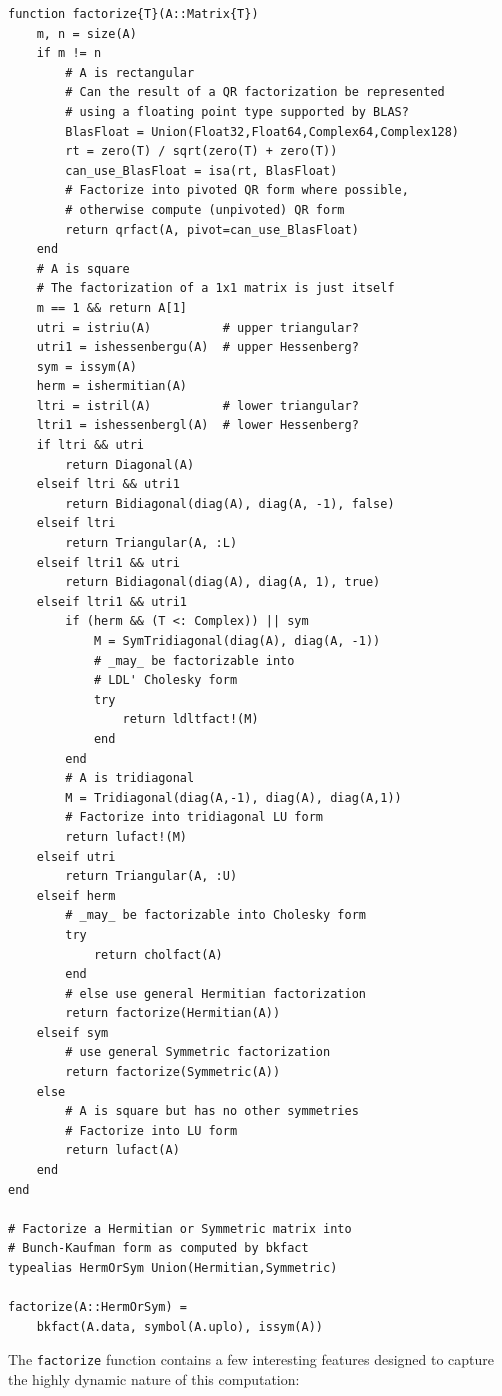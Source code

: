 \documentclass[10pt, preprint]{sigplanconf}
\begin{document}
\begin{lstlisting}
function factorize{T}(A::Matrix{T})
	m, n = size(A)
	if m != n
		# A is rectangular
		# Can the result of a QR factorization be represented
		# using a floating point type supported by BLAS?
		BlasFloat = Union(Float32,Float64,Complex64,Complex128)
		rt = zero(T) / sqrt(zero(T) + zero(T))
		can_use_BlasFloat = isa(rt, BlasFloat)
		# Factorize into pivoted QR form where possible,
		# otherwise compute (unpivoted) QR form
		return qrfact(A, pivot=can_use_BlasFloat)
	end
	# A is square
	# The factorization of a 1x1 matrix is just itself
	m == 1 && return A[1]
	utri = istriu(A)          # upper triangular?
	utri1 = ishessenbergu(A)  # upper Hessenberg?
	sym = issym(A)
	herm = ishermitian(A)
	ltri = istril(A)          # lower triangular?
	ltri1 = ishessenbergl(A)  # lower Hessenberg?
	if ltri && utri
		return Diagonal(A)
	elseif ltri && utri1
		return Bidiagonal(diag(A), diag(A, -1), false)
	elseif ltri
		return Triangular(A, :L)
	elseif ltri1 && utri
		return Bidiagonal(diag(A), diag(A, 1), true)
	elseif ltri1 && utri1
		if (herm && (T <: Complex)) || sym
			M = SymTridiagonal(diag(A), diag(A, -1))
			# _may_ be factorizable into
			# LDL' Cholesky form
			try
				return ldltfact!(M)
			end
		end
		# A is tridiagonal
		M = Tridiagonal(diag(A,-1), diag(A), diag(A,1))
		# Factorize into tridiagonal LU form
		return lufact!(M)
	elseif utri
		return Triangular(A, :U)
	elseif herm
		# _may_ be factorizable into Cholesky form
		try
			return cholfact(A)
		end
		# else use general Hermitian factorization
		return factorize(Hermitian(A))
	elseif sym
		# use general Symmetric factorization
		return factorize(Symmetric(A))
	else
		# A is square but has no other symmetries
		# Factorize into LU form
		return lufact(A)
	end
end

# Factorize a Hermitian or Symmetric matrix into
# Bunch-Kaufman form as computed by bkfact
typealias HermOrSym Union(Hermitian,Symmetric)

factorize(A::HermOrSym) =
    bkfact(A.data, symbol(A.uplo), issym(A))
\end{lstlisting}

The \verb|factorize| function contains a few interesting features
designed to capture the highly dynamic nature of this computation:
\end{document}

